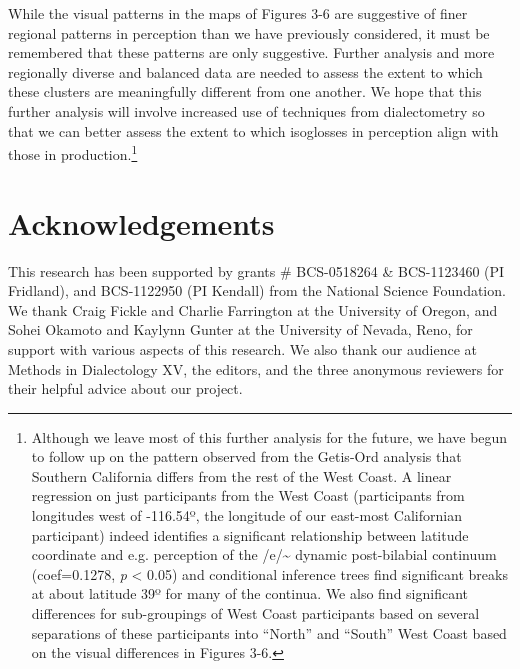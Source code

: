 \documentclass[output=paper]{LSP/langsci}
\begin{document}
While the visual patterns in the maps of Figures 3-6 are suggestive of finer regional patterns in perception than we have previously considered, it must be remembered that these patterns are only suggestive. Further analysis and more regionally diverse and balanced data are needed to assess the extent to which these clusters are meaningfully different from one another. We hope that this further analysis will involve increased use of techniques from dialectometry so that we can better assess the extent to which isoglosses in perception align with those in production.\footnote{Although we leave most of this further analysis for the future, we have begun to follow up on the pattern observed from the Getis-Ord analysis that Southern California differs from the rest of the West Coast. A linear regression on just participants from the West Coast (participants from longitudes west of -116.54º, the longitude of our east-most Californian participant) indeed identifies a significant relationship between latitude coordinate and e.g. perception of the /e/\~{}
dynamic post-bilabial continuum (coef=0.1278, \textit{p} {\textless} 0.05) and conditional inference trees find significant breaks at about latitude 39º for many of the continua. We also find significant differences for sub-groupings of West Coast participants based on several separations of these participants into “North” and “South” West Coast based on the visual differences in Figures 3-6.}

\section*{Acknowledgements}
This research has been supported by grants \# BCS-0518264 \& BCS-1123460 (PI Fridland), and BCS-1122950 (PI Kendall) from the National Science Foundation. We thank Craig Fickle and Charlie Farrington at the University of Oregon, and Sohei Okamoto and Kaylynn Gunter at the University of Nevada, Reno, for support with various aspects of this research. We also thank our audience at Methods in Dialectology XV, the editors, and the three anonymous reviewers for their helpful advice about our project.

\printbibliography[heading=subbibliography,notkeyword=this]
\end{document}
